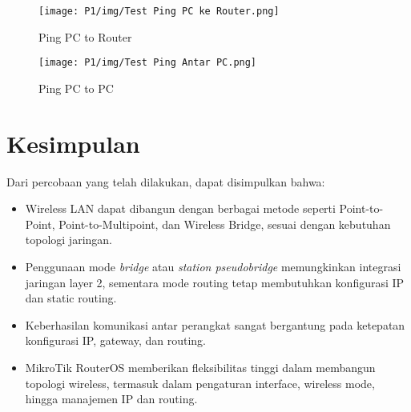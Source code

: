 \begin{figure}[H]
  \centering
  \begin{minipage}[t]{0.48\textwidth}
    \centering
    \texttt{[image: P1/img/Test Ping PC ke Router.png]}
    \caption{Ping PC to Router}
    \label{fig:production}
  \end{minipage}
  \hfill
  \begin{minipage}[t]{0.48\textwidth}
    \centering
    \texttt{[image: P1/img/Test Ping Antar PC.png]}
    \caption{Ping PC to PC}
    \label{fig:admin}
  \end{minipage}
\end{figure}


\section{Kesimpulan}

Dari percobaan yang telah dilakukan, dapat disimpulkan bahwa:

\begin{itemize}
  \item Wireless LAN dapat dibangun dengan berbagai metode seperti Point-to-Point, Point-to-Multipoint, dan Wireless Bridge, sesuai dengan kebutuhan topologi jaringan.
  
  \item Penggunaan mode \textit{bridge} atau \textit{station pseudobridge} memungkinkan integrasi jaringan layer 2, sementara mode routing tetap membutuhkan konfigurasi IP dan static routing.
  
  \item Keberhasilan komunikasi antar perangkat sangat bergantung pada ketepatan konfigurasi IP, gateway, dan routing.
  
  \item MikroTik RouterOS memberikan fleksibilitas tinggi dalam membangun topologi wireless, termasuk dalam pengaturan interface, wireless mode, hingga manajemen IP dan routing.
\end{itemize}
